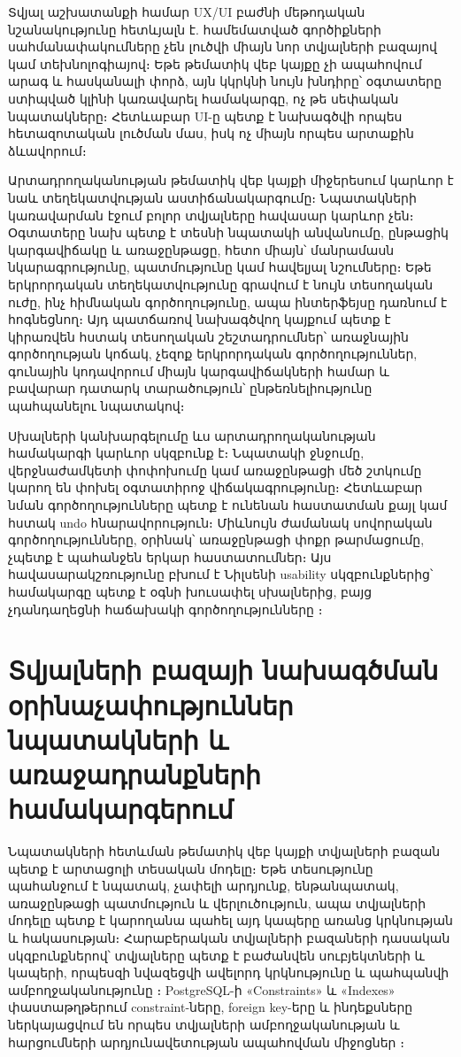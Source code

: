 Տվյալ աշխատանքի համար UX/UI բաժնի մեթոդական նշանակությունը հետևյալն է. համեմատված գործիքների սահմանափակումները չեն լուծվի միայն նոր տվյալների բազայով կամ տեխնոլոգիայով։ Եթե թեմատիկ վեբ կայքը չի ապահովում արագ և հասկանալի փորձ, այն կկրկնի նույն խնդիրը՝ օգտատերը ստիպված կլինի կառավարել համակարգը, ոչ թե սեփական նպատակները։ Հետևաբար UI-ը պետք է նախագծվի որպես հետազոտական լուծման մաս, իսկ ոչ միայն որպես արտաքին ձևավորում։

Արտադրողականության թեմատիկ վեբ կայքի միջերեսում կարևոր է նաև տեղեկատվության աստիճանակարգումը։ Նպատակների կառավարման էջում բոլոր տվյալները հավասար կարևոր չեն։ Օգտատերը նախ պետք է տեսնի նպատակի անվանումը, ընթացիկ կարգավիճակը և առաջընթացը, հետո միայն՝ մանրամասն նկարագրությունը, պատմությունը կամ հավելյալ նշումները։ Եթե երկրորդական տեղեկատվությունը գրավում է նույն տեսողական ուժը, ինչ հիմնական գործողությունը, ապա ինտերֆեյսը դառնում է հոգնեցնող։ Այդ պատճառով նախագծվող կայքում պետք է կիրառվեն հստակ տեսողական շեշտադրումներ՝ առաջնային գործողության կոճակ, չեզոք երկրորդական գործողություններ, գունային կոդավորում միայն կարգավիճակների համար և բավարար դատարկ տարածություն՝ ընթեռնելիությունը պահպանելու նպատակով։

Սխալների կանխարգելումը ևս արտադրողականության համակարգի կարևոր սկզբունք է։ Նպատակի ջնջումը, վերջնաժամկետի փոփոխումը կամ առաջընթացի մեծ շտկումը կարող են փոխել օգտատիրոջ վիճակագրությունը։ Հետևաբար նման գործողությունները պետք է ունենան հաստատման քայլ կամ հստակ undo հնարավորություն։ Միևնույն ժամանակ սովորական գործողությունները, օրինակ՝ առաջընթացի փոքր թարմացումը, չպետք է պահանջեն երկար հաստատումներ։ Այս հավասարակշռությունը բխում է Նիլսենի usability սկզբունքներից՝ համակարգը պետք է օգնի խուսափել սխալներից, բայց չդանդաղեցնի հաճախակի գործողությունները \autocite{nielsen2012usability}։

\section{Տվյալների բազայի նախագծման օրինաչափություններ նպատակների և առաջադրանքների համակարգերում}

Նպատակների հետևման թեմատիկ վեբ կայքի տվյալների բազան պետք է արտացոլի տեսական մոդելը։ Եթե տեսությունը պահանջում է նպատակ, չափելի արդյունք, ենթանպատակ, առաջընթացի պատմություն և վերլուծություն, ապա տվյալների մոդելը պետք է կարողանա պահել այդ կապերը առանց կրկնության և հակասության։ Հարաբերական տվյալների բազաների դասական սկզբունքներով՝ տվյալները պետք է բաժանվեն սուբյեկտների և կապերի, որպեսզի նվազեցվի ավելորդ կրկնությունը և պահպանվի ամբողջականությունը \autocite{date2004introduction}։ PostgreSQL-ի «Constraints» և «Indexes» փաստաթղթերում constraint-ները, foreign key-երը և ինդեքսները ներկայացվում են որպես տվյալների ամբողջականության և հարցումների արդյունավետության ապահովման միջոցներ \autocite{postgresDocsConstraints,postgresDocsIndexes}։

